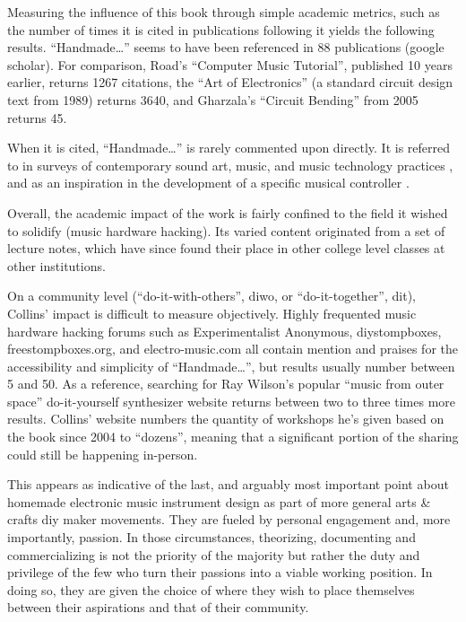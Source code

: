 	Measuring the influence of this book through simple academic metrics, such as the number of times it is cited in publications following it \cite{harzing2008} yields the following results. “Handmade…” seems to have been referenced in 88 publications (google scholar). For comparison, Road’s “Computer Music Tutorial”, published 10 years earlier, returns 1267 citations, the “Art of Electronics” (a standard circuit design text from 1989) returns 3640, and Gharzala’s “Circuit Bending” from 2005 returns 45. 

	When it is cited, “Handmade…” is rarely commented upon directly. It is referred to in surveys of contemporary sound art, music, and music technology practices \cite{kelly2011,mills2010,pigott2011,rodgers2010}, and as an inspiration in the development of a specific musical controller \cite{ariza2007,hoadley2010,murphy2010,riis2013,valle2011}.
	
	Overall, the academic impact of the work is fairly confined to the field it wished to solidify (music hardware hacking). Its varied content originated from a set of lecture notes, which have since found their place in other college level classes at other institutions. 

On a community level (“do-it-with-others”, diwo, or “do-it-together”, dit), Collins’ impact is difficult to measure objectively. Highly frequented music hardware hacking forums such as Experimentalist Anonymous, diystompboxes, freestompboxes.org, and electro-music.com all contain mention and praises for the accessibility and simplicity of “Handmade…”, but results usually number between 5 and 50. As a reference, searching for Ray Wilson’s popular “music from outer space” do-it-yourself synthesizer website returns between two to three times more results. Collins’ website numbers the quantity of workshops he’s given based on the book since 2004 to “dozens”, meaning that a significant portion of the sharing could still be happening in-person.  

This appears as indicative of the last, and arguably most important point about homemade electronic music instrument design as part of more general arts & crafts \/ diy \/ maker movements. They are fueled by personal engagement and, more importantly, passion. In those circumstances, theorizing, documenting and commercializing is not the priority of the majority but rather the duty and privilege of the few who turn their passions into a viable working position. In doing so, they are given the choice of where they wish to place themselves between their aspirations and that of their community. 

